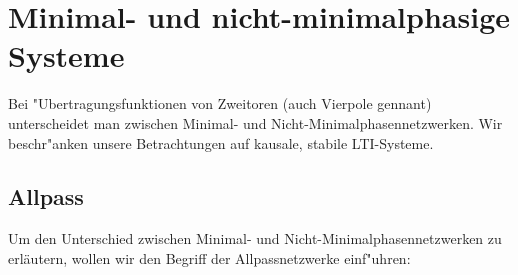 {\newpage
\section{Minimal- und nicht-minimalphasige Systeme}
Bei "Ubertragungsfunktionen von Zweitoren (auch
Vierpole gennant) unterscheidet man zwischen Minimal-
und
Nicht-Minimalphasennetzwerken.
 Wir beschr"anken unsere Betrachtungen auf kausale, stabile LTI-Systeme.

\subsection{Allpass}
Um den Unterschied zwischen Minimal- und Nicht-Minimalphasennetzwerken
zu er\-l\"autern, wollen wir den
Begriff der Allpassnetzwerke einf"uhren:\\~\\
\\~\\

}
